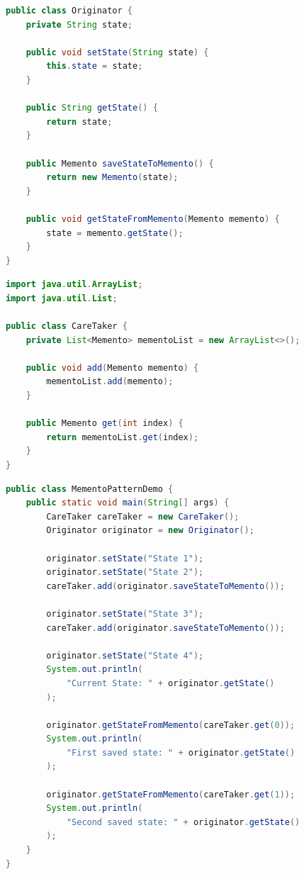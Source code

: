 \begin{lstlisting}[language=Java, title=Originator.java]
public class Originator {
    private String state;

    public void setState(String state) {
        this.state = state;
    }

    public String getState() {
        return state;
    }

    public Memento saveStateToMemento() {
        return new Memento(state);
    }

    public void getStateFromMemento(Memento memento) {
        state = memento.getState();
    }
}
\end{lstlisting}

\begin{lstlisting}[language=Java, title=CareTaker.java]
import java.util.ArrayList;
import java.util.List;

public class CareTaker {
    private List<Memento> mementoList = new ArrayList<>();

    public void add(Memento memento) {
        mementoList.add(memento);
    }

    public Memento get(int index) {
        return mementoList.get(index);
    }
}
\end{lstlisting}

\begin{lstlisting}[language=Java, title=MementoPatternDemo.java]
public class MementoPatternDemo {
    public static void main(String[] args) {
        CareTaker careTaker = new CareTaker();
        Originator originator = new Originator();

        originator.setState("State 1");
        originator.setState("State 2");
        careTaker.add(originator.saveStateToMemento());

        originator.setState("State 3");
        careTaker.add(originator.saveStateToMemento());

        originator.setState("State 4");
        System.out.println(
            "Current State: " + originator.getState()
        );

        originator.getStateFromMemento(careTaker.get(0));
        System.out.println(
            "First saved state: " + originator.getState()
        );

        originator.getStateFromMemento(careTaker.get(1));
        System.out.println(
            "Second saved state: " + originator.getState()
        );
    }
}
\end{lstlisting}

